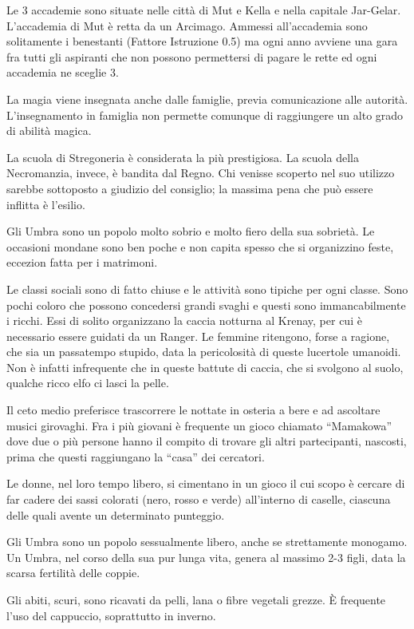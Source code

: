 Le 3 accademie sono situate nelle citt\`a di Mut e Kella e nella
capitale Jar-Gelar. L'accademia di Mut \`e retta da un Arcimago.
Ammessi all'accademia sono solitamente i benestanti (Fattore
Istruzione 0.5) ma ogni anno avviene una gara fra tutti gli aspiranti
che non possono permettersi di pagare le rette ed ogni accademia ne
sceglie 3.

La magia viene insegnata anche dalle famiglie, previa comunicazione
alle autorit\`a. L'insegnamento in famiglia non permette comunque di
raggiungere un alto grado di abilit\`a magica. 

La scuola di Stregoneria \`e considerata la pi\`u prestigiosa. La
scuola della Necromanzia, invece, \`e bandita dal Regno.  Chi venisse
scoperto nel suo utilizzo sarebbe sottoposto a giudizio del consiglio;
la massima pena che pu\`o essere inflitta \`e l'esilio.

\Moda Gli Umbra sono un popolo molto sobrio e molto fiero della sua
sobriet\`a.  Le occasioni mondane sono ben poche e non capita spesso
che si organizzino feste, eccezion fatta per i matrimoni.

Le classi sociali sono di fatto chiuse e le attivit\`a sono tipiche
per ogni classe. Sono pochi coloro che possono concedersi grandi
svaghi e questi sono immancabilmente i ricchi. Essi di solito
organizzano la caccia notturna al Krenay, per cui \`e necessario
essere guidati da un Ranger. Le femmine ritengono, forse a ragione,
che sia un passatempo stupido, data la pericolosit\`a di queste
lucertole umanoidi. Non \`e infatti infrequente che in queste battute
di caccia, che si svolgono al suolo, qualche ricco elfo ci lasci la
pelle.

Il ceto medio preferisce trascorrere le nottate in osteria a bere e ad
ascoltare musici girovaghi. Fra i pi\`u giovani \`e frequente un gioco
chiamato ``Mamakowa'' dove due o pi\`u persone hanno il compito di
trovare gli altri partecipanti, nascosti, prima che questi raggiungano
la ``casa'' dei cercatori.

Le donne, nel loro tempo libero, si cimentano in un gioco il cui scopo
\`e cercare di far cadere dei sassi colorati (nero, rosso e verde)
all'interno di caselle, ciascuna delle quali avente un determinato
punteggio.

Gli Umbra sono un popolo sessualmente libero, anche se strettamente
monogamo. Un Umbra, nel corso della sua pur lunga vita, genera al
massimo 2-3 figli, data la scarsa fertilit\`a delle coppie.

Gli abiti, scuri, sono ricavati da pelli, lana o fibre vegetali
grezze. \`E frequente l'uso del cappuccio, soprattutto in inverno.

